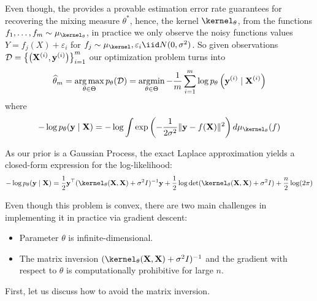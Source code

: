 \documentclass{article}
\newcommand{\nsamples}{{n}}
\newcommand{\nfunctions}{{m}}
\begin{document}
Even though, the  provides a provable estimation error rate guarantees for recovering the mixing measure $\theta^*$, hence, the kernel $\kernel_\theta$, from the functions $f_1, \ldots, f_{\nfunctions} \sim \mu_{\kernel_\theta}$, in practice we only observe the noisy functions values $Y = f_j(X) + \varepsilon_i$ for $f_j \sim \mu_\kernel, \varepsilon_i \iid N(0, \sigma^2)$.
So given observations $\dataset = \left\{\left(\mathbf{X}^{(i)}, \mathbf{y}^{(i)}\right)\right\}_{i=1}^{\nfunctions}$ our optimization problem turns into
\begin{gather}\label{eq:loss-w-data}
	\hat \theta_m = \argmax_{\theta \in \Theta} p_\theta(\dataset) =
	\argmin_{\theta \in \Theta}
	-\frac{1}{\nfunctions} \sum_{i=1}^{\nfunctions}
	\log p_\theta\left(\mathbf{y}^{(i)} \mid \mathbf{X}^{(i)}\right)
\end{gather}
where
\begin{align*}
	- \log p_\theta(\mathbf{y} \mid \mathbf{X}) =
	-\log \int \exp\left(-\frac{1}{2\sigma^2}\|\mathbf{y} - f(\mathbf{X})\|^2\right) d\mu_{\kernel_\theta}(f)
\end{align*}

As our prior is a Gaussian Process, the exact Laplace approximation yields a closed-form expression for the log-likelihood:
\begin{align*}
	- \log p_\theta(\mathbf{y} \mid \mathbf{X}) =
	\frac{1}{2} \mathbf{y}^\top (\kernel_\theta(\mathbf{X}, \mathbf{X}) + \sigma^2 I)^{-1} \mathbf{y}
	+ \frac{1}{2} \log \det(\kernel_\theta(\mathbf{X}, \mathbf{X}) + \sigma^2 I)
	+ \frac{\nsamples}{2} \log(2\pi)
\end{align*}

Even though this problem is convex, there are two main challenges in implementing it in practice via gradient descent:
\begin{itemize}
	\item Parameter $\theta$ is infinite-dimensional.
	\item The matrix inversion $(\kernel_\theta(\mathbf{X}, \mathbf{X}) + \sigma^2 I)^{-1}$ and the gradient with respect to $\theta$ is computationally prohibitive for large $\nsamples$.
\end{itemize}

First, let us discuss how to avoid the matrix inversion.
\end{document}
